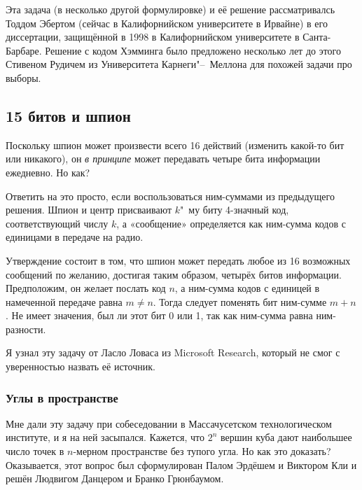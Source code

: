\documentclass[twoside]{book}
\begin{document}
\medskip

Эта задача (в несколько другой формулировке) и её решение рассматривалсь Тоддом Эбертом (сейчас в Калифорнийском университете в Ирвайне) в его диссертации, защищённой в 1998 в Калифорнийском университете в Санта-Барбаре.
Решение с кодом Хэмминга было предложено  несколько лет до этого Стивеном Рудичем из Университета Карнеги"--~Меллона  для похожей задачи про выборы.

\subsection*{15 битов и шпион}

Поскольку шпион может произвести всего 16 действий (изменить какой-то бит или никакого),  он \emph{в принципе} может передавать четыре бита информации ежедневно.
Но как?

Ответить на это просто, если воспользоваться ним-суммами из предыдущего решения.
Шпион и  центр присваивают $k$"~му биту 4-значный код, соответствующий числу $k$, а «сообщение» определяется как ним-сумма кодов с единицами в передаче на радио.

Утверждение состоит в том, что шпион может передать любое из 16 возможных сообщений по  желанию,
достигая таким образом, четырёх битов информации.
Предположим, он желает послать код $n$, а ним-сумма кодов с единицей в намеченной передаче равна $m\ne n$.
Тогда  следует поменять бит ним-сумме $m+n$.
Не имеет значения, был ли этот бит 0 или 1, так как ним-сумма равна ним-разности.
\heart

\medskip

Я узнал эту задачу от Ласло Ловаса из Microsoft Research, который не смог с уверенностью назвать её источник.

\subsubsection*{Углы в пространстве}

Мне дали эту задачу при собеседовании в Массачусетском технологическом институте, и я на ней засыпался.
Кажется, что $2^n$ вершин куба дают наибольшее число точек в $n$-мерном пространстве без тупого угла.
Но как это доказать?
Оказывается, этот вопрос был сформулирован Палом Эрдёшем и Виктором Кли и решён Людвигом Данцером и Бранко Грюнбаумом. %
\end{document}

